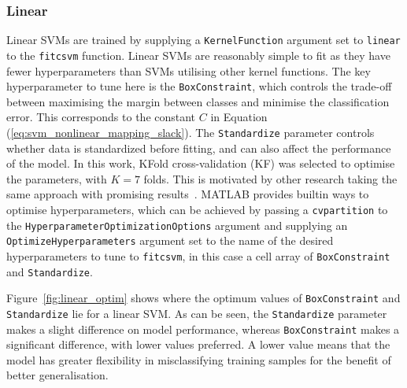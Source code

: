 \subsubsection{Linear}

Linear SVMs are trained by supplying a \texttt{KernelFunction} argument set to
\texttt{linear} to the \texttt{fitcsvm} function. Linear SVMs are reasonably
simple to fit as they have fewer hyperparameters than SVMs utilising other kernel
functions. The key hyperparameter to tune here is the \texttt{BoxConstraint}, which
controls the trade-off between maximising the margin between classes and
minimise the classification error. This corresponds to the constant $C$ in
Equation (\ref{eq:svm_nonlinear_mapping_slack}). The \texttt{Standardize}
parameter controls whether data is standardized before fitting, and can also
affect the performance of the model. In this work, KFold cross-validation (KF)
was selected to optimise the parameters, with $K=7$ folds. This is motivated by
other research taking the same approach with promising
results~\cite{ramashini2022robust}. MATLAB provides builtin ways to optimise
hyperparameters, which can be achieved by passing a \texttt{cvpartition} to the
\texttt{HyperparameterOptimizationOptions} argument and supplying an
\texttt{OptimizeHyperparameters} argument set to the name of the desired
hyperparameters to tune to \texttt{fitcsvm}, in this case a cell array of
\texttt{BoxConstraint} and \texttt{Standardize}.

Figure~\ref{fig:linear_optim} shows where the optimum values of
\texttt{BoxConstraint} and \texttt{Standardize} lie for a linear SVM\@. As can
be seen, the \texttt{Standardize} parameter makes a slight difference on model
performance, whereas \texttt{BoxConstraint} makes a significant difference, with
lower values preferred. A lower value means that the model has greater
flexibility in misclassifying training samples for the benefit of better
generalisation.

